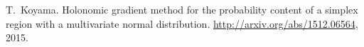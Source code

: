 \documentclass[12pt]{article}
\begin{document}
\iftrue

\begin{thebibliography}{1}

T.~Koyama.
\newblock Holonomic gradient method for the probability content of a simplex
  region with a multivariate normal distribution.
\newblock \url{http://arxiv.org/abs/1512.06564}, 2015.

\end{thebibliography}

\else




\fi

\end{document}

